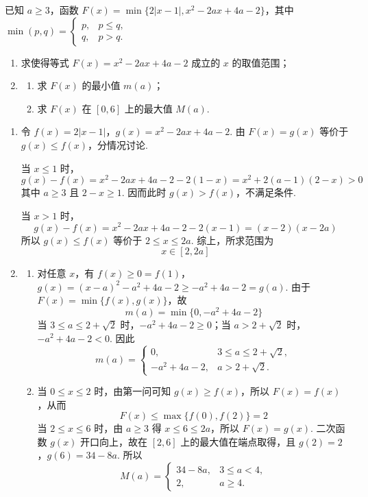 \begin{problem}
已知 \( a\ge 3 \)，函数 \( F(x)=\min\{2|x-1|,x^2-2ax+4a-2\} \)，其中 \( \min(p,q)=\begin{cases}
p, & p\le q,\\
q, & p>q.
\end{cases} \)

\begin{enumerate}
\item 求使得等式 \( F(x)=x^2-2ax+4a-2 \) 成立的 \( x \) 的取值范围；
\item\begin{enumerate}
\item 求 \( F(x) \) 的最小值 \( m(a) \)；
\item 求 \( F(x) \) 在 \( [0,6] \) 上的最大值 \( M(a) \).
\end{enumerate}
\end{enumerate}
\end{problem}

\begin{solution}
\begin{enumerate}
\item 令 \(f(x)=2|x-1|\)，\(g(x)=x^2-2ax+4a-2\). 由 \(F(x)=g(x)\) 等价于 \(g(x)\leqslant f(x)\)，分情况讨论.

当 \(x\leqslant1\) 时，
\[
g(x)-f(x)=x^2-2ax+4a-2-2(1-x)
=x^2+2(a-1)(2-x)>0
\]
其中 \(a\geqslant3\) 且 \(2-x\geqslant1\). 因而此时 \(g(x)>f(x)\)，不满足条件.

当 \(x>1\) 时，
\[
g(x)-f(x)=x^2-2ax+4a-2-2(x-1)
=(x-2)(x-2a)
\]
所以 \(g(x)\leqslant f(x)\) 等价于 \(2\leqslant x\leqslant2a\). 综上，所求范围为
\[
x\in[2,2a]
\]

\item
\begin{enumerate}
\item 对任意 \(x\)，有
\(f(x)\geqslant0=f(1)\)，\(g(x)=(x-a)^2-a^2+4a-2\geqslant-a^2+4a-2=g(a)\).
由于 \(F(x)=\min\{f(x),g(x)\}\)，故
\[
m(a)=\min\{0,-a^2+4a-2\}
\]
当 \(3\leqslant a\leqslant2+\sqrt2\) 时，\(-a^2+4a-2\geqslant0\)；当 \(a>2+\sqrt2\) 时，\(-a^2+4a-2<0\). 因此
\[
m(a)=
\begin{cases}
0, & 3\leqslant a\leqslant2+\sqrt2,\\
-a^2+4a-2, & a>2+\sqrt2.
\end{cases}
\]

\item 当 \(0\leqslant x\leqslant2\) 时，由第一问可知 \(g(x)\geqslant f(x)\)，所以 \(F(x)=f(x)\)，从而
\[
F(x)\leqslant\max\{f(0),f(2)\}=2
\]
当 \(2\leqslant x\leqslant6\) 时，由 \(a\geqslant3\) 得 \(x\leqslant6\leqslant2a\)，所以 \(F(x)=g(x)\). 二次函数 \(g(x)\) 开口向上，故在 \([2,6]\) 上的最大值在端点取得，且
\(g(2)=2\)，\(g(6)=34-8a\).
所以
\[
M(a)=
\begin{cases}
34-8a, & 3\leqslant a<4,\\
2, & a\geqslant4.
\end{cases}
\]
\end{enumerate}
\end{enumerate}
\end{solution}


